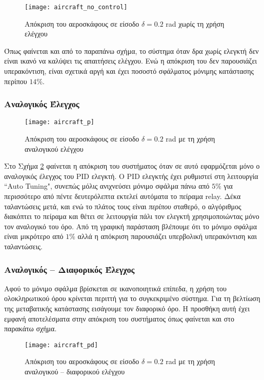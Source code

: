 \begin{figure}[h]
  \centering
  \texttt{[image: aircraft\_no\_control]}
  \caption{Απόκριση του αεροσκάφους σε είσοδο $\delta = 0.2$ rad χωρίς τη χρήση ελέγχου}
  \label{fig:aircraft_no_control}
\end{figure}

Όπως φαίνεται και από το παραπάνω σχήμα, το σύστημα όταν δρα χωρίς ελεγκτή δεν είναι ικανό να καλύψει τις απαιτήσεις ελέγχου. Ενώ η απόκριση του δεν παρουσιάζει υπερακόντιση, είναι σχετικά αργή και έχει ποσοστό σφάλματος μόνιμης κατάστασης περίπου $14\%$.

\subsubsection{Αναλογικός Έλεγχος}

\begin{figure}[h]
  \centering
  \texttt{[image: aircraft\_p]}
  \caption{Απόκριση του αεροσκάφους σε είσοδο $\delta = 0.2$ rad με τη χρήση αναλογικού ελέγχου}
  \label{fig:aircraft_p}
\end{figure}

Στο Σχήμα \ref{fig:aircraft_p} φαίνεται η απόκριση του συστήματος όταν σε αυτό εφαρμόζεται μόνο ο αναλογικός έλεγχος του PID ελεγκτή. Ο PID ελεγκτής έχει ρυθμιστεί στη λειτουργία ``Auto Tuning", συνεπώς μόλις ανιχνεύσει μόνιμο σφάλμα πάνω από $5\%$ για περισσότερο από πέντε δευτερόλεπτα εκτελεί αυτόματα το πείραμα relay. Δέκα ταλαντώσεις μετά, και ενώ το πλάτος τους είναι \emph{περίπου} σταθερό, ο αλγόριθμος διακόπτει το πείραμα και θέτει σε λειτουργία πάλι τον ελεγκτή χρησιμοποιώντας μόνο τον αναλογικό του όρο. Από τη γραφική παράσταση βλέπουμε ότι το μόνιμο σφάλμα είναι μικρότερο από $1\%$ αλλά η απόκριση παρουσιάζει υπερβολική υπερακόντιση και ταλαντώσεις.

\subsubsection{Αναλογικός -- Διαφορικός Έλεγχος}

Αφού το μόνιμο σφάλμα βρίσκεται σε ικανοποιητικά επίπεδα, η χρήση του ολοκληρωτικού όρου κρίνεται περιττή για το συγκεκριμένο σύστημα. Για τη βελτίωση της μεταβατικής κατάστασης εισάγουμε τον διαφορικό όρο. Η προσθήκη αυτή έχει εμφανή αποτελέσματα στην απόκριση του συστήματος όπως φαίνεται και στο παρακάτω σχήμα.

\begin{figure}[h]
  \centering
  \texttt{[image: aircraft\_pd]}
  \caption{Απόκριση του αεροσκάφους σε είσοδο $\delta = 0.2$ rad με τη χρήση αναλογικού -- διαφορικού ελέγχου}
  \label{fig:aircraft_pd}
\end{figure}

